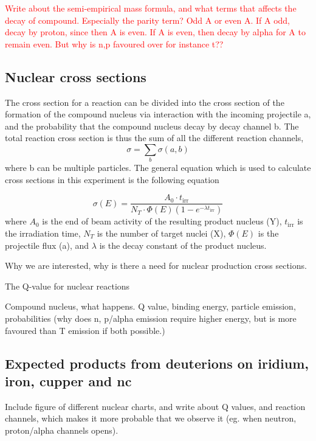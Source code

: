 \documentclass[a4paper,11pt,twoside]{book}
\begin{document}
\textcolor{red}{Write about the semi-empirical mass formula, and what terms that affects the decay of compound. Especially the parity term? Odd A or even A. If A odd, decay by proton, since then A is even. If A is even, then decay by alpha for A to remain even. But why is n,p favoured over for instance t?? }

\subsection{Nuclear cross sections}

The cross section for a reaction can be divided into the cross section of the formation of the compound nucleus via interaction with the incoming projectile a, and the probability that the compound nucleus decay by decay channel b. The total reaction cross section is thus the sum of all the different reaction channels, 
\begin{equation}
    \sigma = \sum_b \sigma(a,b)
\end{equation}
where b can be multiple particles. The general equation which is used to calculate cross sections in this experiment is the following equation

\begin{equation}
    \sigma(E) = \frac{A_0 \cdot t_\text{irr}}{N_T \cdot \Phi(E)(1-e^{-\lambda t_\text{irr}})}
\end{equation}
\noindent where $A_0$ is the end of beam activity of the resulting product nucleus (Y), $t_\text{irr}$ is the irradiation time, $N_T$ is the number of target nuclei (X), $\Phi(E)$ is the projectile flux (a), and $\lambda$ is the decay constant of the product nucleus. 

\newpage

Why we are interested, why is there a need for nuclear production cross sections. 



The Q-value for nuclear reactions 

Compound nucleus, what happens. 
Q value, binding energy, particle emission, probabilities (why does n, p/alpha emission require higher energy, but is more favoured than T emission if both possible.)


\subsection{Expected products from deuterions on iridium, iron, cupper and nc}

Include figure of different nuclear charts, and write about Q values, and reaction channels, which makes it more probable that we observe it (eg. when neutron, proton/alpha channels opens).
\end{document}

